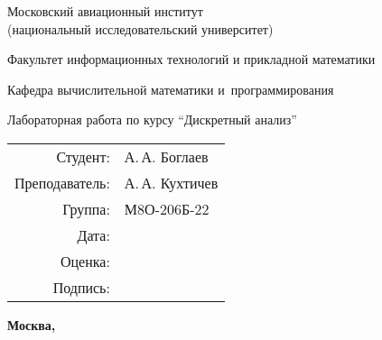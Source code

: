 \begin{titlepage}
    \begin{center}
    \bfseries
    
    {\Large Московский авиационный институт\\ (национальный исследовательский университет)
    
    }
    
    \vspace{48pt}
    
    {\large Факультет информационных технологий и прикладной математики
    }
    
    \vspace{36pt}
    
    {\large Кафедра вычислительной математики и~программирования
    
    }
    
    
    \vspace{48pt}
    
    Лабораторная работа  по курсу \enquote{Дискретный анализ}
    
    \end{center}
    
    \vspace{72pt}
    
    \begin{flushright}
    \begin{tabular}{rl}
    Студент: & А.\,А. Боглаев \\
    Преподаватель: & А.\,А. Кухтичев \\
    Группа: & М8О-206Б-22 \\
    Дата: & \\
    Оценка: & \\
    Подпись: & \\
    \end{tabular}
    \end{flushright}
    
    \vfill
    
    \begin{center}
    \bfseries
    Москва, \the\year
    \end{center}
    \end{titlepage}
    
    \pagebreak